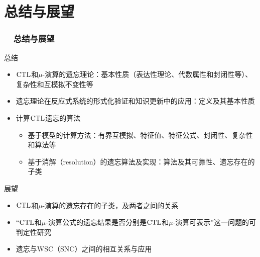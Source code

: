 \documentclass[aspectratio=1610, 9pt, CJK]{beamer}
\begin{document}
	
	\section{总结与展望}
	\begin{frame}
		\frametitle{~~总结与展望}
		\begin{block}{总结}
		\begin{itemize}%
			\item $\textrm{CTL}$和$\mu$-演算的遗忘理论：基本性质（表达性理论、代数属性和封闭性等）、复杂性和互模拟不变性等
			\item 遗忘理论在反应式系统的形式化验证和知识更新中的应用：定义及其基本性质
			\item 计算$\textrm{CTL}$遗忘的算法
			\begin{itemize}
				\item 基于模型的计算方法：有界互模拟、特征值、特征公式、封闭性、复杂性和算法等
				\item 基于消解（resolution）的遗忘算法及实现：算法及其可靠性、遗忘存在的子类
			\end{itemize}
		\end{itemize}
		\end{block}
	
		\begin{block}{展望}
			\begin{itemize}
				\item $\textrm{CTL}$和$\mu$-演算的遗忘存在的子类，及两者之间的关系
				\item “$\textrm{CTL}$和$\mu$-演算公式的遗忘结果是否分别是$\textrm{CTL}$和$\mu$-演算可表示”这一问题的可判定性研究
				\item 遗忘与WSC（SNC）之间的相互关系与应用
			\end{itemize}
		\end{block}	
	\end{frame}
	
\end{document}
